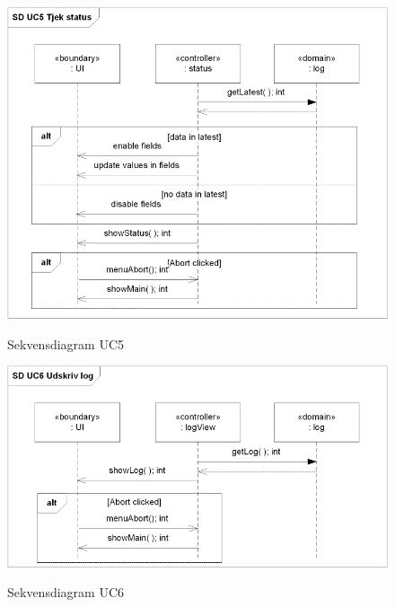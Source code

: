 \begin{figure}[htbp] \centering
{\includegraphics[scale=1]{filer/design/a_uc5}}
\caption{Sekvensdiagram UC5}
\label{fig:Sekvensdiagram UC5}
\end{figure} 

\begin{figure}[htbp] \centering
{\includegraphics[scale=1]{filer/design/a_uc6}}
\caption{Sekvensdiagram UC6}
\label{fig:Sekvensdiagram UC6}
\end{figure} 

